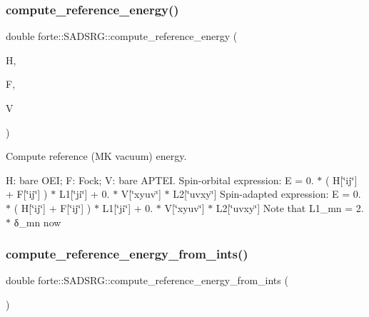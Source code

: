 \subsubsection{\texorpdfstring{compute\+\_\+reference\+\_\+energy()}{compute\_reference\_energy()}}
{\footnotesize\ttfamily double forte\+::\+S\+A\+D\+S\+R\+G\+::compute\+\_\+reference\+\_\+energy (\begin{DoxyParamCaption}\item[{Blocked\+Tensor}]{H,  }\item[{Blocked\+Tensor}]{F,  }\item[{Blocked\+Tensor}]{V }\end{DoxyParamCaption})\hspace{0.3cm}{\ttfamily [protected]}}



Compute reference (MK vacuum) energy. 

H\+: bare O\+EI; F\+: Fock; V\+: bare A\+P\+T\+EI. Spin-\/orbital expression\+: E = 0. $\ast$ ( H\mbox{[}\char`\"{}ij\char`\"{}\mbox{]} + F\mbox{[}\char`\"{}ij\char`\"{}\mbox{]} ) $\ast$ L1\mbox{[}\char`\"{}ji\char`\"{}\mbox{]} + 0. $\ast$ V\mbox{[}\char`\"{}xyuv\char`\"{}\mbox{]} $\ast$ L2\mbox{[}\char`\"{}uvxy\char`\"{}\mbox{]} Spin-\/adapted expression\+: E = 0. $\ast$ ( H\mbox{[}\char`\"{}ij\char`\"{}\mbox{]} + F\mbox{[}\char`\"{}ij\char`\"{}\mbox{]} ) $\ast$ L1\mbox{[}\char`\"{}ji\char`\"{}\mbox{]} + 0. $\ast$ V\mbox{[}\char`\"{}xyuv\char`\"{}\mbox{]} $\ast$ L2\mbox{[}\char`\"{}uvxy\char`\"{}\mbox{]} Note that L1\+\_\+mn = 2. $\ast$ δ\+\_\+mn now \mbox{\label{classforte_1_1_s_a_d_s_r_g_aaf7c3764bf6d3d08a8340ce37ca053db}} 
\subsubsection{\texorpdfstring{compute\+\_\+reference\+\_\+energy\+\_\+from\+\_\+ints()}{compute\_reference\_energy\_from\_ints()}}
{\footnotesize\ttfamily double forte\+::\+S\+A\+D\+S\+R\+G\+::compute\+\_\+reference\+\_\+energy\+\_\+from\+\_\+ints (\begin{DoxyParamCaption}{ }\end{DoxyParamCaption})\hspace{0.3cm}{\ttfamily [protected]}}



